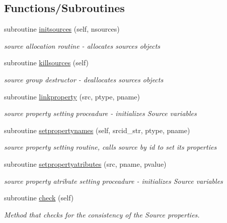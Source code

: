 \subsection*{Functions/\+Subroutines}
\begin{DoxyCompactItemize}
\item 
subroutine \mbox{\hyperlink{namespacesources__mod_a6da3303e5c39d77c0111ec50623bf5fe}{initsources}} (self, nsources)
\begin{DoxyCompactList}\small\item\em source allocation routine -\/ allocates sources objects \end{DoxyCompactList}\item 
subroutine \mbox{\hyperlink{namespacesources__mod_aee745aa084adcfa41ecfc3469b90aa8e}{killsources}} (self)
\begin{DoxyCompactList}\small\item\em source group destructor -\/ deallocates sources objects \end{DoxyCompactList}\item 
subroutine \mbox{\hyperlink{namespacesources__mod_a683ca7e4aca7a0050aad9f506569fca9}{linkproperty}} (src, ptype, pname)
\begin{DoxyCompactList}\small\item\em source property setting proceadure -\/ initializes Source variables \end{DoxyCompactList}\item 
subroutine \mbox{\hyperlink{namespacesources__mod_aa76f16f8ee96bc86b553aa54d420321c}{setpropertynames}} (self, srcid\+\_\+str, ptype, pname)
\begin{DoxyCompactList}\small\item\em source property setting routine, calls source by id to set its properties \end{DoxyCompactList}\item 
subroutine \mbox{\hyperlink{namespacesources__mod_abbb4557b46c533439fe258cecf31a76c}{setpropertyatributes}} (src, pname, pvalue)
\begin{DoxyCompactList}\small\item\em source property atribute setting proceadure -\/ initializes Source variables \end{DoxyCompactList}\item 
subroutine \mbox{\hyperlink{namespacesources__mod_a6fcfcb690cd1b9375915b01f7ddbe801}{check}} (self)
\begin{DoxyCompactList}\small\item\em Method that checks for the consistency of the Source properties. \end{DoxyCompactList}\item 

\end{DoxyCompactItemize}

